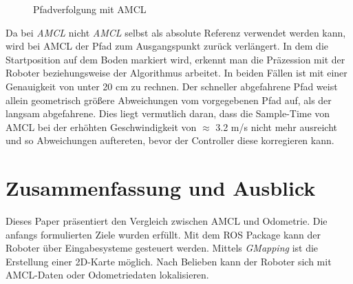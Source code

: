 \documentclass[11pt,a4paper]{article}
\begin{document}
{\begin{figure}[h]
	\centering
	\caption{Pfadverfolgung mit AMCL}
\end{figure}

Da bei \textit{AMCL} nicht \textit{AMCL} selbst als absolute Referenz verwendet werden kann, wird bei AMCL der Pfad zum Ausgangspunkt zur\"uck verl\"angert. In dem die Startposition auf dem Boden markiert wird, erkennt man die Pr\"azession mit der Roboter beziehungsweise der Algorithmus arbeitet.
In beiden F\"allen ist mit einer Genauigkeit von unter 20 cm zu rechnen. Der schneller abgefahrene Pfad weist allein geometrisch gr\"o{\ss}ere Abweichungen vom vorgegebenen Pfad auf, als der langsam abgefahrene. 
Dies liegt vermutlich daran, dass die Sample-Time von AMCL bei der erh\"ohten Geschwindigkeit  von $\approx$ 3.2 m/s nicht mehr ausreicht und so Abweichungen auftereten, bevor der Controller diese korregieren kann. 



\section{Zusammenfassung und Ausblick}


Dieses Paper pr\"asentiert den Vergleich zwischen AMCL und Odometrie. Die anfangs formulierten Ziele wurden erf\"ullt. Mit dem ROS Package kann der Roboter \"uber Eingabesysteme gesteuert werden. Mittels \textit{GMapping} ist die Erstellung einer 2D-Karte m\"oglich. Nach Belieben kann der Roboter sich mit AMCL-Daten oder Odometriedaten lokalisieren. 

}
\end{document}
